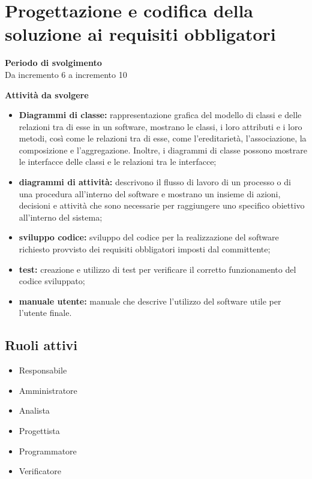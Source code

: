 \section{Progettazione e codifica della soluzione ai requisiti obbligatori}

\textbf{Periodo di svolgimento}
\\ Da incremento 6 a incremento 10

\textbf{Attività da svolgere}
    \begin{itemize}
        \item \textbf{Diagrammi di classe:} rappresentazione grafica del modello di classi e delle relazioni tra di esse in un software, mostrano le classi, i loro attributi e i loro metodi, così come le relazioni tra di esse, come l'ereditarietà, l'associazione, la composizione e l'aggregazione. Inoltre, i diagrammi di classe possono mostrare le interfacce delle classi e le relazioni tra le interfacce; 
        \item \textbf{diagrammi di attività:} descrivono il flusso di lavoro di un processo o di una procedura all'interno del software e mostrano un insieme di azioni, decisioni e attività che sono necessarie per raggiungere uno specifico obiettivo all'interno del sistema;
        \item \textbf{sviluppo codice:} sviluppo del codice per la realizzazione del software richiesto provvisto dei requisiti obbligatori imposti dal committente;
        \item \textbf{test:} creazione e utilizzo di test per verificare il corretto funzionamento del codice sviluppato;
        \item \textbf{manuale utente:} manuale che descrive l'utilizzo del software utile per l'utente finale.
    \end{itemize}

\subsection{Ruoli attivi}
\begin{itemize}
    \item Responsabile 
    \item Amministratore
    \item Analista
    \item Progettista 
    \item Programmatore 
    \item Verificatore 
\end{itemize}


